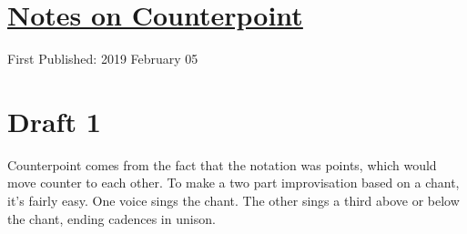 \documentclass[12pt]{article}[titlepage]
\newcommand{\1}{\={a}}
\newcommand{\2}{\={e}}
\newcommand{\3}{\={\i}}
\newcommand{\4}{\=o}
\newcommand{\5}{\=u}
\newcommand{\6}{\={A}}
\renewcommand{\,}{\textsuperscript{,}}
\begin{document}
\doublespacing
\section{\href{notes-on-counterpoint.html}{Notes on Counterpoint}}
First Published: 2019 February 05
\section{Draft 1}
Counterpoint comes from the fact that the notation was points, which would move counter to each other.
To make a two part improvisation based on a chant, it's fairly easy.
One voice sings the chant.
The other sings a third above or below the chant, ending cadences in unison. 
\end{document}
